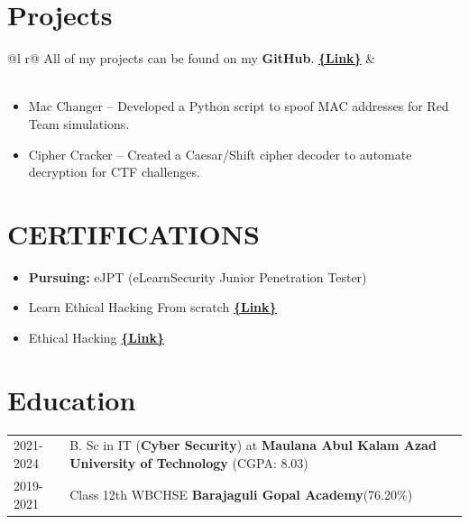 \documentclass[a4paper,12pt]{article}
\begin{document}
\section{\textbf{Projects}}

\begin{tabularx}{\linewidth}{ @{}l r@{} }
All of my projects can be found on my \textbf{GitHub}. \hspace{0.5cm}  \href{https://github.com/XENOFER}{\textbf{\{Link\}}} & \hfill  \\[3.75pt]
  \\
\end{tabularx}
\begin{itemize}
    \item Mac Changer -- Developed a Python script to spoof MAC addresses for Red Team simulations.
    \item  Cipher Cracker -- Created a Caesar/Shift cipher decoder to automate decryption for CTF challenges.
\end{itemize}

\section{\textbf{CERTIFICATIONS}}
\begin{itemize}
    \item  {\textbf{Pursuing:}} eJPT (eLearnSecurity Junior Penetration Tester)
    \item Learn Ethical Hacking From scratch  \hspace{0.5cm}\href{https://udemy-certificate.s3.amazonaws.com/pdf/UC-bb21bb08-50c2-4603-a808-638c7418bfe9.pdf}{\textbf{\{Link\}}}
    \item Ethical Hacking  \hspace{0.5cm} \href{https://drive.google.com/file/d/15vbf5h4OEnkhlSE-mXCN94pCqaR-uK-s/view?usp=sharing}{\textbf{\{Link\}}}
\end{itemize}

\section{\textbf{Education}}
\begin{tabularx}{\linewidth}{@{}l X@{}}
2021-2024 & B. Sc in IT (\textbf{Cyber Security})  at \textbf{Maulana Abul Kalam Azad University of Technology } \hfill  (CGPA: 8.03) \\
2019-2021 & Class 12th WBCHSE \textbf{Barajaguli Gopal Academy}\hfill  (76.20\%) \\
\end{tabularx}
\end{document}
